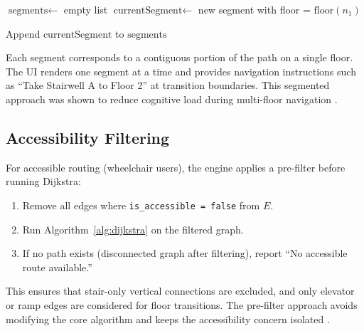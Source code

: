 \begin{algorithm}[H]
\caption{Floor Transition Detection in Path}
\label{alg:floor-transition}
\SetAlgoLined
{}

\BlankLine
$\text{segments} \leftarrow$ empty list\;
$\text{currentSegment} \leftarrow$ new segment with floor = $\text{floor}(n_1)$\;

\BlankLine
{}
Append $\text{currentSegment}$ to $\text{segments}$\;

\BlankLine
{}\;
\end{algorithm}

Each segment corresponds to a contiguous portion of the path on a single floor. The UI renders one segment at a time and provides navigation instructions such as ``Take Stairwell A to Floor 2'' at transition boundaries. This segmented approach was shown to reduce cognitive load during multi-floor navigation \cite{DeCock2021}.

\subsection{Accessibility Filtering}

For accessible routing (wheelchair users), the engine applies a pre-filter before running Dijkstra:

\begin{enumerate}
  \item Remove all edges where \texttt{is\_accessible = false} from $E$.
  \item Run Algorithm~\ref{alg:dijkstra} on the filtered graph.
  \item If no path exists (disconnected graph after filtering), report ``No accessible route available.''
\end{enumerate}

This ensures that stair-only vertical connections are excluded, and only elevator or ramp edges are considered for floor transitions. The pre-filter approach avoids modifying the core algorithm and keeps the accessibility concern isolated \cite{Xiong2020}.
